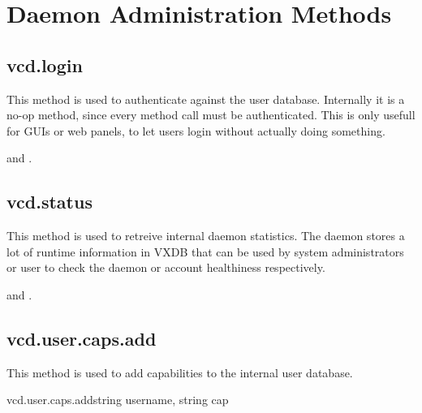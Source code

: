 \chapter{Daemon Administration Methods}


\section{vcd.login}

This method is used to authenticate against the user database. Internally it is
a no-op method, since every method call must be authenticated. This is only
usefull for GUIs or web panels, to let users login without actually doing
something.


\begin{rpcaccess}
\rpcnocapability and \rpcnoownerchecks.
\end{rpcaccess}

\rpcreturnnil

\rpcnoerrors


\section{vcd.status}

This method is used to retreive internal daemon statistics. The daemon stores a
lot of runtime information in VXDB that can be used by system administrators or
user to check the daemon or account healthiness respectively.


\begin{rpcaccess}
 and \rpcnoownerchecks.
\end{rpcaccess}

\rpcreturnnil

\rpcnoerrors



\section{vcd.user.caps.add}

This method is used to add capabilities to the internal user database.

\begin{rpcsynopsis}{vcd.user.caps.add}{string username, string cap}
\end{rpcsynopsis}

